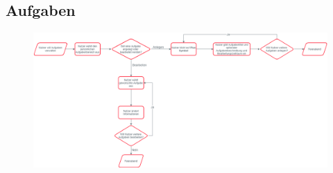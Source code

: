 	\begin{landscape}
		\section{Aufgaben}
			\begin{figure}[!h]
				\includegraphics[width=\linewidth, keepaspectratio]{img/Prozesse/tasks}
			\end{figure}
	\end{landscape}
